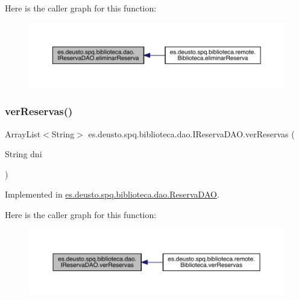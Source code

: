 Here is the caller graph for this function\+:
\nopagebreak
\begin{figure}[H]
\begin{center}
\leavevmode
\includegraphics[width=350pt]{interfacees_1_1deusto_1_1spq_1_1biblioteca_1_1dao_1_1_i_reserva_d_a_o_a696cce84b9719e9e858eec9064daa72f_icgraph}
\end{center}
\end{figure}
\mbox{\label{interfacees_1_1deusto_1_1spq_1_1biblioteca_1_1dao_1_1_i_reserva_d_a_o_aab8b6916e33fd28d632bab5fe2f1801c}} 
\subsubsection{\texorpdfstring{ver\+Reservas()}{verReservas()}}
{\footnotesize\ttfamily Array\+List$<$String$>$ es.\+deusto.\+spq.\+biblioteca.\+dao.\+I\+Reserva\+D\+A\+O.\+ver\+Reservas (\begin{DoxyParamCaption}\item[{String}]{dni }\end{DoxyParamCaption})}



Implemented in \mbox{\hyperlink{classes_1_1deusto_1_1spq_1_1biblioteca_1_1dao_1_1_reserva_d_a_o_a553798fbb62f35db87554e0b431f527b}{es.\+deusto.\+spq.\+biblioteca.\+dao.\+Reserva\+D\+AO}}.

Here is the caller graph for this function\+:
\nopagebreak
\begin{figure}[H]
\begin{center}
\leavevmode
\includegraphics[width=350pt]{interfacees_1_1deusto_1_1spq_1_1biblioteca_1_1dao_1_1_i_reserva_d_a_o_aab8b6916e33fd28d632bab5fe2f1801c_icgraph}
\end{center}
\end{figure}


